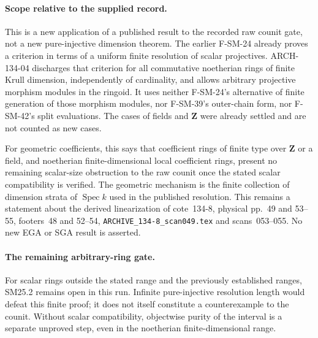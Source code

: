 \paragraph{Scope relative to the supplied record.}
This is a new application of a published result to the recorded raw
counit gate, not a new pure-injective dimension theorem.  The earlier
F-SM-24 already proves a criterion in terms of a uniform finite
resolution of scalar projectives.  ARCH-134-04 discharges that criterion
for all commutative noetherian rings of finite Krull dimension,
independently of cardinality, and allows arbitrary projective morphism
modules in the ringoid.  It uses neither F-SM-24's alternative of finite
generation of those morphism modules, nor F-SM-39's outer-chain form,
nor F-SM-42's split evaluations.  The cases of fields and $\mathbf Z$
were already settled and are not counted as new cases.

For geometric coefficients, this says that coefficient rings of finite
type over $\mathbf Z$ or a field, and noetherian finite-dimensional
local coefficient rings, present no remaining scalar-size obstruction
to the raw counit once the stated scalar compatibility is verified.
The geometric mechanism is the finite collection of dimension strata
of $\operatorname{Spec}k$ used in the published resolution.
This remains a statement about the derived linearization of
cote~134-8, physical pp.~49 and 53--55, footers~48 and 52--54,
\texttt{ARCHIVE\_134-8\_scan049.tex} and scans~053--055.
No new EGA or SGA result is asserted.

\paragraph{The remaining arbitrary-ring gate.}
For scalar rings outside the stated range and the previously established
ranges, SM25.2 remains open in this run.  Infinite pure-injective
resolution length would defeat this finite proof; it does not itself
constitute a counterexample to the counit.  Without scalar compatibility,
objectwise purity of the interval is a separate unproved step, even
in the noetherian finite-dimensional range.
